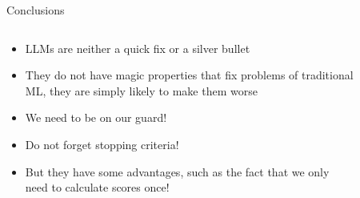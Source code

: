 \documentclass[9pt,aspectratio=169]{beamer}
\begin{document}
\begin{frame}{Conclusions}
	\begin{columns}
		\begin{column}{0.4\linewidth}
			\begin{itemize}
				\item<1-> LLMs are neither a quick fix or a silver bullet
				\item<2-> They do not have magic properties that fix problems of traditional ML, they are simply likely to make them worse
				\item<3-> We need to be on our guard!
				\item<4-> Do not forget stopping criteria!
				\item<5-> But they have some advantages, such as the fact that we only need to calculate scores once!
			\end{itemize}
		\end{column}
		\begin{column}{0.6\linewidth}
			\begin{figure}
			\end{figure}
		\end{column}
	\end{columns}

\end{frame}

%	
%	
%	
%	
%	
%	 
%	
%	
%	
%	



\begin{frame}
	
\end{frame}
\end{document}
